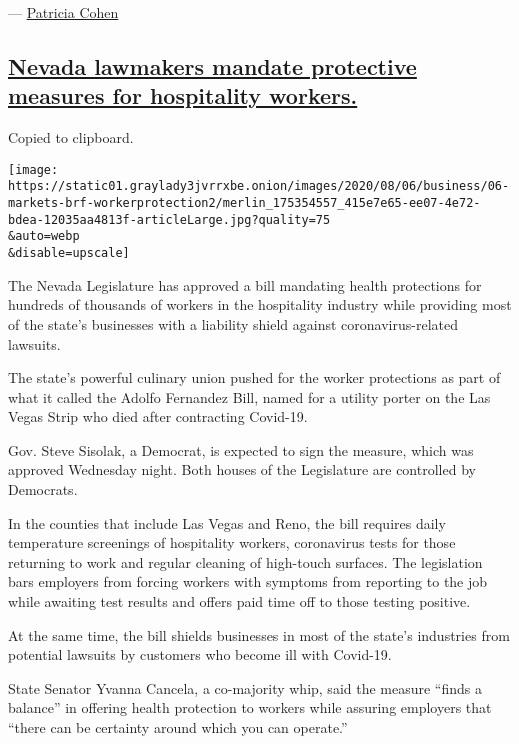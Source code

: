 --- \href{https://www.nytimes3xbfgragh.onion/by/patricia-cohen}{Patricia
Cohen}

\hypertarget{nevada-lawmakers-mandate-protective-measures-for-hospitality-workers}{%
\subsection{\texorpdfstring{\protect\hyperlink{nevada-lawmakers-mandate-protective-measures-for-hospitality-workers}{Nevada
lawmakers mandate protective measures for hospitality
workers.}}{Nevada lawmakers mandate protective measures for hospitality workers.}}\label{nevada-lawmakers-mandate-protective-measures-for-hospitality-workers}}

Copied to clipboard.

\texttt{[image: https://static01.graylady3jvrrxbe.onion/images/2020/08/06/business/06-markets-brf-workerprotection2/merlin\_175354557\_415e7e65-ee07-4e72-bdea-12035aa4813f-articleLarge.jpg?quality=75\\\&auto=webp\\\&disable=upscale]}

The Nevada Legislature has approved a bill mandating health protections
for hundreds of thousands of workers in the hospitality industry while
providing most of the state's businesses with a liability shield against
coronavirus-related lawsuits.

The state's powerful culinary union pushed for the worker protections as
part of what it called the Adolfo Fernandez Bill, named for a utility
porter on the Las Vegas Strip who died after contracting Covid-19.

Gov. Steve Sisolak, a Democrat, is expected to sign the measure, which
was approved Wednesday night. Both houses of the Legislature are
controlled by Democrats.

In the counties that include Las Vegas and Reno, the bill requires daily
temperature screenings of hospitality workers, coronavirus tests for
those returning to work and regular cleaning of high-touch surfaces. The
legislation bars employers from forcing workers with symptoms from
reporting to the job while awaiting test results and offers paid time
off to those testing positive.

At the same time, the bill shields businesses in most of the state's
industries from potential lawsuits by customers who become ill with
Covid-19.

State Senator Yvanna Cancela, a co-majority whip, said the measure
``finds a balance'' in offering health protection to workers while
assuring employers that ``there can be certainty around which you can
operate.''

